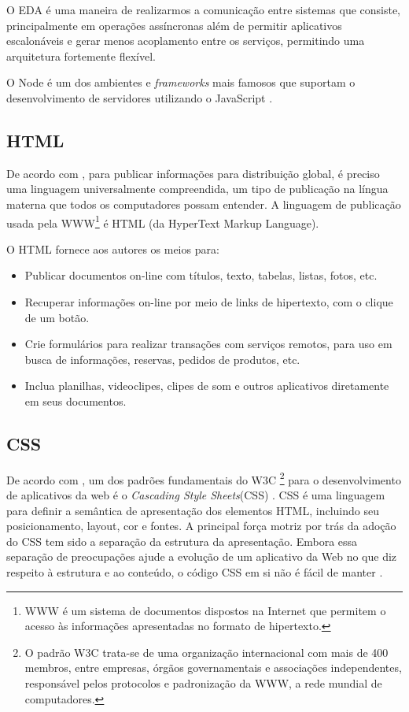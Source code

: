 O EDA é uma maneira de realizarmos a comunicação entre sistemas que consiste, principalmente em operações assíncronas além de permitir aplicativos escalonáveis e gerar menos acoplamento entre os serviços, permitindo uma arquitetura fortemente flexível. 

O Node é um dos ambientes e \textit{frameworks} mais famosos que suportam o desenvolvimento de servidores utilizando o JavaScript \cite{Tilkov2010}.

\subsection{HTML}

De acordo com \citeauthor{html}, para publicar informações para distribuição global, é preciso uma linguagem universalmente compreendida, um tipo de publicação na língua materna que todos os computadores possam entender. A linguagem de publicação usada pela WWW\footnote{WWW é um sistema de documentos dispostos na Internet que permitem o acesso às informações apresentadas no formato de hipertexto.} é HTML (da HyperText Markup Language). 

O HTML fornece aos autores os meios para: 
\begin{itemize}
    \item Publicar documentos on-line com títulos, texto, tabelas, listas, fotos, etc. 
    \item Recuperar informações on-line por meio de links de hipertexto, com o clique de um botão. 
    \item Crie formulários para realizar transações com serviços remotos, para uso em busca de informações, reservas, pedidos de produtos, etc. 
    \item Inclua planilhas, videoclipes, clipes de som e outros aplicativos diretamente em seus documentos.
\end{itemize}

\subsection{CSS}
De acordo com \citeauthor{css}, um dos padrões fundamentais do W3C \footnote{O padrão W3C trata-se de uma organização internacional com mais de 400 membros, entre empresas, órgãos governamentais e associações independentes, responsável pelos protocolos e padronização da WWW, a rede mundial de computadores.} para o desenvolvimento de aplicativos da web é o \textit{Cascading Style Sheets}(CSS) \cite{Casca8378199:online}. CSS é uma linguagem para definir a semântica de apresentação dos elementos HTML, incluindo seu posicionamento, layout, cor e fontes. A principal força motriz por trás da adoção do CSS tem sido a separação da estrutura da apresentação. Embora essa separação de preocupações ajude a evolução de um aplicativo da Web no que diz respeito à estrutura e ao conteúdo, o código CSS em si não é fácil de manter \cite{badros1999constraint}. 

